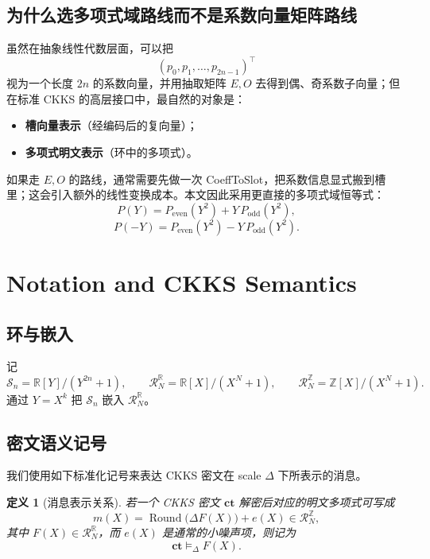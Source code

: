 \documentclass[11pt,a4paper]{ctexart}
\newcommand{\RR}{\mathbb{R}}
\newcommand{\ZZ}{\mathbb{Z}}
\newcommand{\Rbig}{\mathcal{R}_N^{\RR}}
\newcommand{\Rint}{\mathcal{R}_N^{\ZZ}}
\newcommand{\Ssmall}{\mathcal{S}_n}
\newcommand{\Round}{\operatorname{Round}}
\newcommand{\rep}{\mathrel{\vDash_{\Delta}}}
\newcommand{\Pe}{P_{\mathrm{even}}}
\newcommand{\Po}{P_{\mathrm{odd}}}
\newtheorem{definition}{定义}[section]
\begin{document}
\subsection{为什么选多项式域路线而不是系数向量矩阵路线}

虽然在抽象线性代数层面，可以把
\[
(p_0,p_1,\dots,p_{2n-1})^\top
\]
视为一个长度 \(2n\) 的系数向量，并用抽取矩阵 \(E,O\) 去得到偶、奇系数子向量；但在标准 CKKS 的高层接口中，最自然的对象是：

\begin{itemize}
    \item \textbf{槽向量表示}（经编码后的复向量）；
    \item \textbf{多项式明文表示}（环中的多项式）。
\end{itemize}

如果走 \(E,O\) 的路线，通常需要先做一次 CoeffToSlot，把系数信息显式搬到槽里；这会引入额外的线性变换成本。本文因此采用更直接的多项式域恒等式：
\begin{equation}
P(Y)=\Pe(Y^2)+Y\,\Po(Y^2), \label{eq:split}
\end{equation}
\begin{equation}
P(-Y)=\Pe(Y^2)-Y\,\Po(Y^2). \label{eq:split-minus}
\end{equation}

\section{Notation and CKKS Semantics}

\subsection{环与嵌入}

记
\[
\Ssmall=\RR[Y]/(Y^{2n}+1),
\qquad
\Rbig=\RR[X]/(X^N+1),
\qquad
\Rint=\ZZ[X]/(X^N+1).
\]
通过 \(Y=X^k\) 把 \(\Ssmall\) 嵌入 \(\Rbig\)。

\subsection{密文语义记号}

我们使用如下标准化记号来表达 CKKS 密文在 scale \(\Delta\) 下所表示的消息。

\begin{definition}[消息表示关系]
若一个 CKKS 密文 \(\mathbf{ct}\) 解密后对应的明文多项式可写成
\[
m(X)=\Round\!\bigl(\Delta F(X)\bigr)+e(X)\in \Rint,
\]
其中 \(F(X)\in \Rbig\)，而 \(e(X)\) 是通常的小噪声项，则记为
\[
\mathbf{ct}\rep F(X).
\]
\end{definition}
\end{document}
